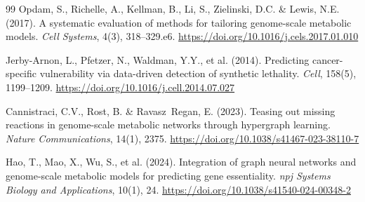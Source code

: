 \documentclass[12pt,a4paper]{article}
\begin{document}
\begin{thebibliography}{99}
 Opdam, S., Richelle, A., Kellman, B., Li, S., Zielinski, D.C. \& Lewis, N.E. (2017). A systematic evaluation of methods for tailoring genome-scale metabolic models. \textit{Cell Systems}, 4(3), 318--329.e6. \url{https://doi.org/10.1016/j.cels.2017.01.010}

 Jerby-Arnon, L., Pfetzer, N., Waldman, Y.Y., et al. (2014). Predicting cancer-specific vulnerability via data-driven detection of synthetic lethality. \textit{Cell}, 158(5), 1199--1209. \url{https://doi.org/10.1016/j.cell.2014.07.027}

 Cannistraci, C.V., Rost, B. \& Ravasz~Regan, E. (2023). Teasing out missing reactions in genome-scale metabolic networks through hypergraph learning. \textit{Nature Communications}, 14(1), 2375. \url{https://doi.org/10.1038/s41467-023-38110-7}

 Hao, T., Mao, X., Wu, S., et al. (2024). Integration of graph neural networks and genome-scale metabolic models for predicting gene essentiality. \textit{npj Systems Biology and Applications}, 10(1), 24. \url{https://doi.org/10.1038/s41540-024-00348-2}

\end{thebibliography}
\end{document}
